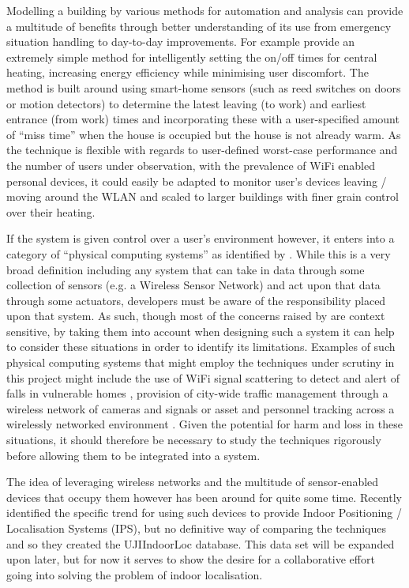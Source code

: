 \documentclass{UoYCSproject}
\begin{document}
            Modelling a building by various methods for automation and analysis can provide a multitude of benefits through better understanding of its use from emergency situation handling to day-to-day improvements. For example \citet{gao2009self} provide an extremely simple method for intelligently setting the on/off times for central heating, increasing energy efficiency while minimising user discomfort. The method is built around using smart-home sensors (such as reed switches on doors or motion detectors) to determine the latest leaving (to work) and earliest entrance (from work) times and incorporating these with a user-specified amount of ``miss time'' when the house is occupied but the house is not already warm. As the technique is flexible with regards to user-defined worst-case performance and the number of users under observation, with the prevalence of WiFi enabled personal devices, it could easily be adapted to monitor user's devices leaving / moving around the WLAN and scaled to larger buildings with finer grain control over their heating.
            
            If the system is given control over a user's environment however, it enters into a category of ``physical computing systems'' as identified by \citet{stankovic2005opportunities}. While this is a very broad definition including any system that can take in data through some collection of sensors (e.g. a Wireless Sensor Network) and act upon that data through some actuators, developers must be aware of the responsibility placed upon that system. As such, though most of the concerns raised by \citeauthor{stankovic2005opportunities} are context sensitive, by taking them into account when designing such a system it can help to consider these situations in order to identify its limitations. Examples of such physical computing systems that might employ the techniques under scrutiny in this project might include the use of WiFi signal scattering to detect and alert of falls in vulnerable homes \citep{han2014wifall}, provision of city-wide traffic management through a wireless network of cameras and signals \citep{LATraffic} or asset and personnel tracking across a wirelessly networked environment \citep{Ekahau}. Given the potential for harm and loss in these situations, it should therefore be necessary to study the techniques rigorously before allowing them to be integrated into a system.
		
            The idea of leveraging wireless networks and the multitude of sensor-enabled devices that occupy them however has been around for quite some time. Recently \citet{torres2014ujiindoorloc} identified the specific trend for using such devices to provide Indoor Positioning / Localisation Systems (IPS), but no definitive way of comparing the techniques and so they created the UJIIndoorLoc database. This data set will be expanded upon later, but for now it serves to show the desire for a collaborative effort going into solving the problem of indoor localisation.
                
\end{document}
